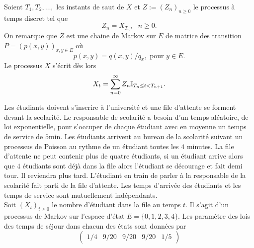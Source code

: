 Soient $T_1,T_2,\ldots,$ les instants de saut de $X$ et $Z:=(Z_n)_{n\geq0}$ le processus à temps discret tel que 
$$
Z_n = X_{T_{n}},\text{ }n\geq0.
$$
On remarque que $Z$ est une chaine de Markov sur $E$ de matrice des transition $P = (p(x,y))_{x,y\in E}$ où 
$$
p(x,y) = q(x,y)/ q_x,\text{ pour }y\in E.
$$
Le processus $X$ s'écrit dès lors 
$$
X_t = \sum_{n=0}^\infty Z_n\mathbb{I}_{T_n\leq t<T_{n+1}}.
$$
\begin{ex}\label{ex:registration}
Les étudiants doivent s'inscrire à l'université et une file d'attente se forment devant la scolarité. Le responsable de scolarité a besoin d'un temps aléatoire, de loi exponentielle, pour s'occuper de chaque étudiant avec en moyenne un temps de service de $5$min. Les étudiants arrivent au bureau de la scolarité suivant un processus de Poisson au rythme de un étudiant toutes les $4$ minutes. La file d'attente ne peut contenir plus de quatre étudiants, si un étudiant arrive alors que $4$ étudiants sont déjà dans la file alors l'étudiant se décourage et fait demi tour. Il reviendra plus tard. L'étudiant en train de parler à la responsable de la scolarité fait parti de la file d'attente. Les temps d'arrivée des étudiants et les temps de service sont mutuellement indépendants.\\

\noindent Soit $(X_t)_{t\geq0}$ le nombre d'étudiant dans la file au temps $t$. Il s'agit d'un processus de Markov sur l'espace d'état $E = \{0,1,2,3,4\}$. Les paramètre des lois des temps de séjour dans chacun des états sont données par 
$$
\left(\begin{array}{ccccc}1/4&9/20&9/20&9/20&1/5\end{array}\right)
$$


\end{ex}
